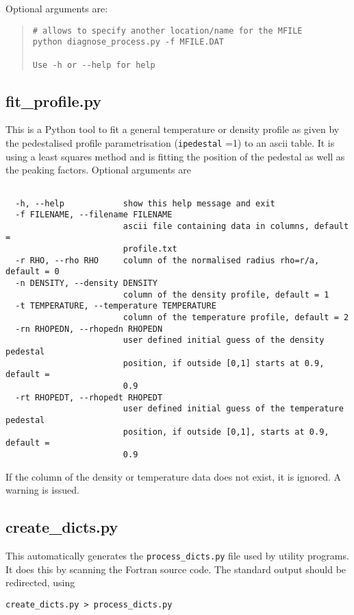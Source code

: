 Optional arguments are:
\begin{quote}
\begin{verbatim}
# allows to specify another location/name for the MFILE
python diagnose_process.py -f MFILE.DAT

Use -h or --help for help

\end{verbatim}
\end{quote}

\subsection{fit\_profile.py}

This is a Python tool to fit a general temperature or density profile as given
by the pedestalised profile parametrisation (\texttt{ipedestal} =1) to an
ascii table. It is using a least squares method and is fitting the position of
the pedestal as well as the peaking factors.  Optional arguments are
\begin{verbatim}

  -h, --help            show this help message and exit
  -f FILENAME, --filename FILENAME
                        ascii file containing data in columns, default =
                        profile.txt
  -r RHO, --rho RHO     column of the normalised radius rho=r/a, default = 0
  -n DENSITY, --density DENSITY
                        column of the density profile, default = 1
  -t TEMPERATURE, --temperature TEMPERATURE
                        column of the temperature profile, default = 2
  -rn RHOPEDN, --rhopedn RHOPEDN
                        user defined initial guess of the density pedestal
                        position, if outside [0,1] starts at 0.9, default =
                        0.9
  -rt RHOPEDT, --rhopedt RHOPEDT
                        user defined initial guess of the temperature pedestal
                        position, if outside [0,1], starts at 0.9, default =
                        0.9

\end{verbatim}
If the column of the density or temperature data does not exist, it is
ignored. A warning is issued.

\subsection{create\_dicts.py}

This automatically generates the \texttt{process\_dicts.py} file used by \process utility programs.  It does this by scanning the Fortran source code.  The standard output should be redirected, using\\
\begin{verbatim}
create_dicts.py > process_dicts.py
\end{verbatim}



